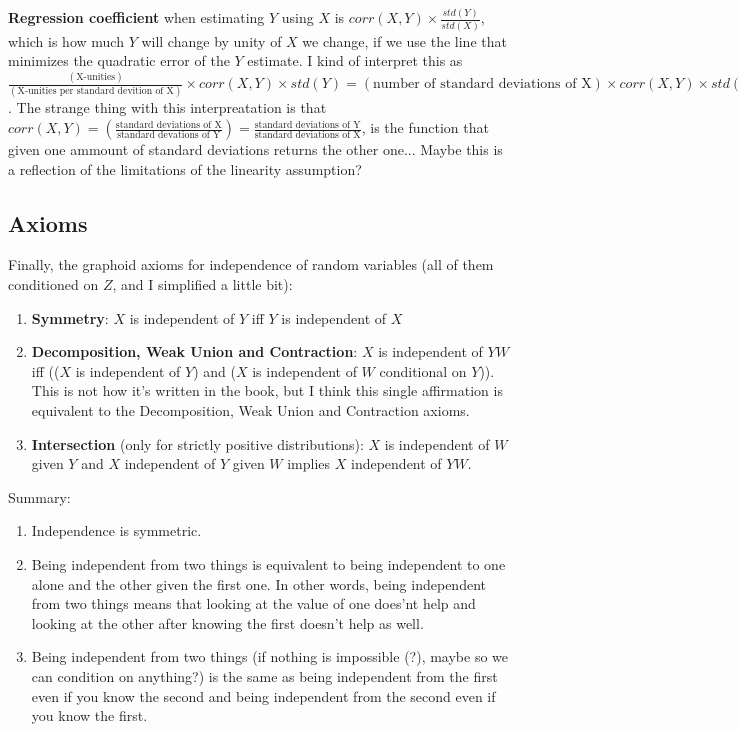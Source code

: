 \textbf{Regression coefficient} when estimating $Y$ using $X$ is $corr(X,Y)\times \frac{std(Y)}{std(X)}$, which is how much $Y$ will change by unity of $X$ we change, if we use the line that minimizes the quadratic error of the $Y$ estimate. I kind of interpret this as $\frac{(\text{X-unities})}{(\text{X-unities per standard devition of X})} \times corr(X,Y) \times std(Y) = (\text{number of standard deviations of X}) \times corr(X,Y) \times std(Y) = (\text{number of standard deviations of Y}) \times (\text{Y-unities per standard deviations of Y}) = (\text{Y-unities})$. The strange thing with this interpreatation is that $corr(X,Y) = (\frac{\text{standard deviations of X}}{\text{standard devations of Y}}) = \frac{\text{standard deviations of Y}}{\text{standard deviations of X}}$, is the function that given one ammount of standard deviations returns the other one... Maybe this is a reflection of the limitations of the linearity assumption?

\subsection{Axioms}

Finally, the graphoid axioms for independence of random variables (all of them conditioned on $Z$, and I simplified a little bit):

\begin{enumerate}
	\item \textbf{Symmetry}: $X$ is independent of $Y$ iff $Y$ is independent of $X$
	\item \textbf{Decomposition, Weak Union and Contraction}: $X$ is independent of $YW$ iff (($X$ is independent of $Y$) and ($X$ is independent of $W$ conditional on $Y$)). This is not how it's written in the book, but I think this single affirmation is equivalent to the Decomposition, Weak Union and Contraction axioms.
	\item \textbf{Intersection} (only for strictly positive distributions): $X$ is independent of $W$ given $Y$ and $X$ independent of $Y$ given $W$ implies $X$ independent of $YW$.
\end{enumerate}

Summary:

\begin{enumerate}
    \item Independence is symmetric.
    \item Being independent from two things is equivalent to being independent to one alone and the other given the first one. In other words, being independent from two things means that looking at the value of one does'nt help and looking at the other after knowing the first doesn't help as well. 
    \item Being independent from two things (if nothing is impossible (?), maybe so we can condition on anything?) is the same as being independent from the first even if you know the second and being independent from the second even if you know the first.
\end{enumerate}



